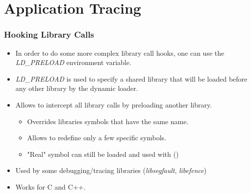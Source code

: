 \section{Application Tracing}




\begin{frame}
  \frametitle{Hooking Library Calls}
  \begin{itemize}
    \item In order to do some more complex library call hooks, one can use
          the {\em LD\_PRELOAD} environment variable.
    \item {\em LD\_PRELOAD} is used to specify a shared library that will be
          loaded before any other library by the dynamic loader.
    \item Allows to intercept all library calls by preloading another library.
    \begin{itemize}
      \item Overrides libraries symbols that have the same name.
      \item Allows to redefine only a few specific symbols.
      \item "Real" symbol can still be loaded and used with  ()
    \end{itemize}
    \item Used by some debugging/tracing libraries ({\em libsegfault},
          {\em libefence})
    \item Works for C and C++.
  \end{itemize}
\end{frame}

